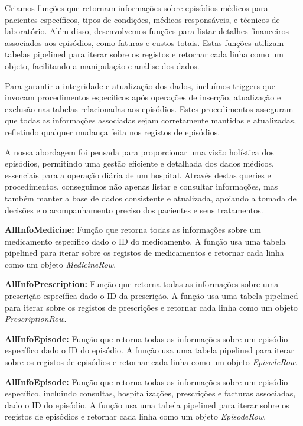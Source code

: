 Criamos funções que retornam informações sobre episódios médicos para pacientes específicos, tipos de condições, médicos responsáveis, e técnicos de laboratório. Além disso, desenvolvemos funções para listar detalhes financeiros associados aos episódios, como faturas e custos totais. Estas funções utilizam tabelas pipelined para iterar sobre os registos e retornar cada linha como um objeto, facilitando a manipulação e análise dos dados.

Para garantir a integridade e atualização dos dados, incluímos triggers que invocam procedimentos específicos após operações de inserção, atualização e exclusão nas tabelas relacionadas aos episódios. Estes procedimentos asseguram que todas as informações associadas sejam corretamente mantidas e atualizadas, refletindo qualquer mudança feita nos registos de episódios.

A nossa abordagem foi pensada para proporcionar uma visão holística dos episódios, permitindo uma gestão eficiente e detalhada dos dados médicos, essenciais para a operação diária de um hospital. Através destas queries e procedimentos, conseguimos não apenas listar e consultar informações, mas também manter a base de dados consistente e atualizada, apoiando a tomada de decisões e o acompanhamento preciso dos pacientes e seus tratamentos.

\vspace{0.15cm}
\textbf{AllInfoMedicine:} Função que retorna todas as informações sobre um medicamento específico dado o ID do medicamento. A função usa uma tabela pipelined para iterar sobre os registos de medicamentos e retornar cada linha como um objeto \textit{MedicineRow}.

\vspace{0.15cm}
\textbf{AllInfoPrescription:} Função que retorna todas as informações sobre uma prescrição específica dado o ID da prescrição. A função usa uma tabela pipelined para iterar sobre os registos de prescrições e retornar cada linha como um objeto \textit{PrescriptionRow}.

\vspace{0.15cm}
\textbf{AllInfoEpisode:} Função que retorna todas as informações sobre um episódio específico dado o ID do episódio. A função usa uma tabela pipelined para iterar sobre os registos de episódios e retornar cada linha como um objeto \textit{EpisodeRow}.

\vspace{0.15cm}
\textbf{AllInfoEpisode:} Função que retorna todas as informações sobre um episódio específico, incluindo consultas, hospitalizações, prescrições e facturas associadas, dado o ID do episódio. A função usa uma tabela pipelined para iterar sobre os registos de episódios e retornar cada linha como um objeto \textit{EpisodeRow}.

